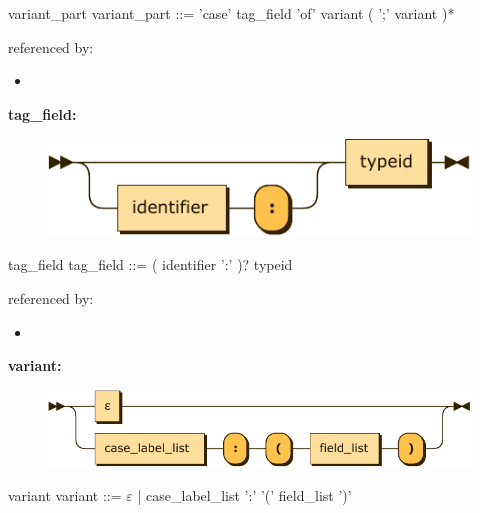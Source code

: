 \documentclass[10pt,a4paper,twoside]{article}
\providecommand{\tightlist}{%
  \setlength{\itemsep}{0pt}\setlength{\parskip}{0pt}}
\newcounter{grammarbox}[section]
\begin{document}
\begin{grammarbox}{variant\_part}
\vspace{0.5em}
variant\_part
         ::= 'case' tag\_field 'of' variant ( ';' variant )*
\end{grammarbox}

referenced by:

\begin{itemize}
\tightlist
\item
\end{itemize}

\textbf{tag\_field:}

\begin{figure}[H]
\centering
\includegraphics{diagram/tag_field.pdf}

\end{figure}

\begin{grammarbox}{tag\_field}
\vspace{0.5em}
tag\_field
         ::= ( identifier ':' )? typeid
\end{grammarbox}

referenced by:

\begin{itemize}
\tightlist
\item
\end{itemize}

\textbf{variant:}

\begin{figure}[H]
\centering
\includegraphics{diagram/variant.pdf}

\end{figure}

\begin{grammarbox}{variant}
\vspace{0.5em}
variant  ::= $\varepsilon$
           | case\_label\_list ':' '(' field\_list ')'
\end{grammarbox}
\end{document}
